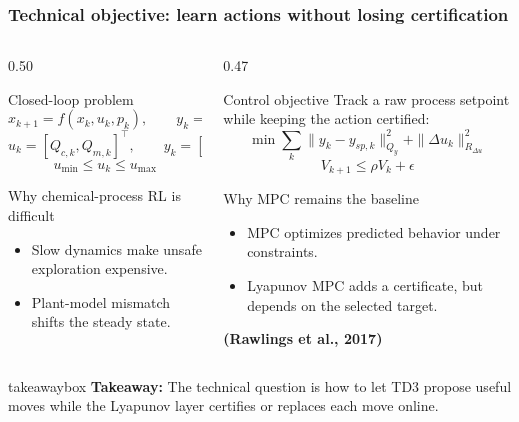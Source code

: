 \documentclass[aspectratio=169]{beamer}
\newcommand{\refnote}[1]{{\bfseries\color{maroon1}\scriptsize (#1)}}
\newcommand{\takeawaybox}[1]{%
\vspace{0.03cm}
\begin{center}
\begin{beamercolorbox}[wd=0.94\textwidth,sep=3pt,center,rounded=true,shadow=false]{takeawaybox}
\scriptsize
\textbf{\textcolor{maroon1}{Takeaway:}} #1
\end{beamercolorbox}
\end{center}
}
\begin{document}
\begin{frame}
\frametitle{\large \textbf{Technical objective: learn actions without losing certification}}
\small

\begin{columns}[T,onlytextwidth]
\begin{column}{0.50\textwidth}
\begin{block}{Closed-loop problem}
\[
x_{k+1}=f(x_k,u_k,p_k), \qquad y_k=h(x_k)
\]
\[
u_k=[Q_{c,k},Q_{m,k}]^\top,\qquad y_k=[\eta_k,T_k]^\top
\]
\[
u_{\min}\le u_k\le u_{\max}
\]
\end{block}

\begin{block}{Why chemical-process RL is difficult}
\begin{itemize}\justifying
  \setlength\itemsep{0.30ex}
  \item Slow dynamics make unsafe exploration expensive.
  \item Plant-model mismatch shifts the steady state.
\end{itemize}
\end{block}
\end{column}

\begin{column}{0.47\textwidth}
\begin{block}{Control objective}
Track a raw process setpoint while keeping the action certified:
\[
\min \sum_k \|y_k-y_{sp,k}\|_{Q_y}^2+\|\Delta u_k\|_{R_{\Delta u}}^2
\]
\[
V_{k+1}\le \rho V_k+\epsilon
\]
\end{block}

\begin{block}{Why MPC remains the baseline}
\begin{itemize}\justifying
  \setlength\itemsep{0.30ex}
  \item MPC optimizes predicted behavior under constraints.
  \item Lyapunov MPC adds a certificate, but depends on the selected target.
\end{itemize}
\refnote{Rawlings et al., 2017}
\end{block}
\end{column}
\end{columns}

\takeawaybox{The technical question is how to let TD3 propose useful moves while the Lyapunov layer certifies or replaces each move online.}
\end{frame}
\end{document}
